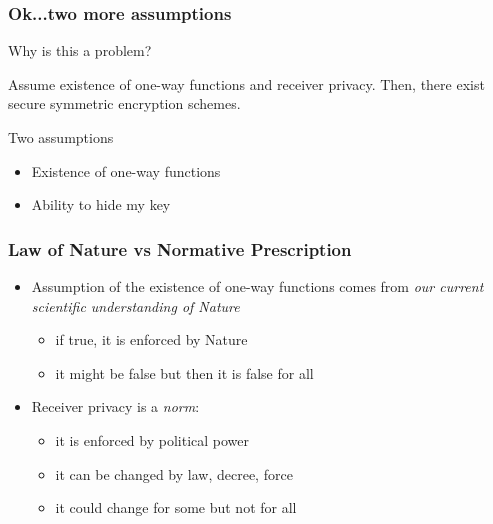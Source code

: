 \documentclass[handout]{beamer}
\begin{document}
\begin{frame}
\frametitle{Ok...two more assumptions}

Why is this a problem?

\begin{theorem}
Assume 
{\color{brown} existence of one-way functions} 
and 
{\color{brown} receiver privacy}.
Then, there exist secure symmetric encryption schemes.
\end{theorem}

\vfill
\begin{block}{Two assumptions}
\begin{itemize}
\item Existence of one-way functions
\item Ability to hide my key
\end{itemize}
\end{block}
\end{frame}

\begin{frame}
\frametitle{Law of Nature vs Normative Prescription}

\begin{itemize}
\item {\color{green} Assumption of the existence of one-way functions comes from
{\em our current scientific understanding of Nature}}
 
    \begin{itemize}
        \item {\color{blue}if true, it is enforced by Nature}
        \item {\color{blue}it might be false but then it is false for all}
    \end{itemize}
\vskip 1cm
\item {\color{green} Receiver privacy is a {\em norm}: }
    
    \begin{itemize}
        \item {\color{blue} it is enforced by political power}
        \item {\color{blue} it can be changed by law, decree, force}
        \item {\color{blue} it could change for some but not for all}
    \end{itemize}
\end{itemize}

\end{frame}
\end{document}
